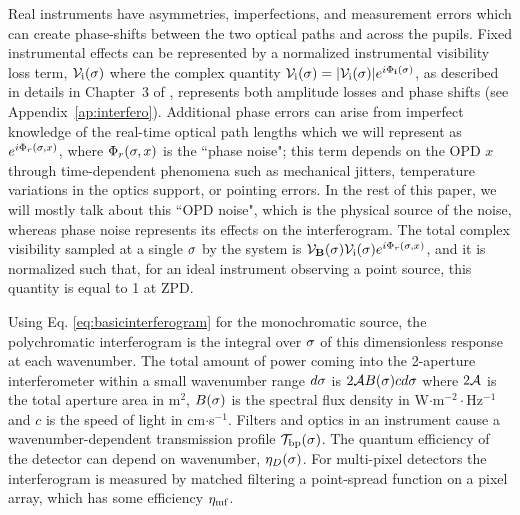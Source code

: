 
Real instruments have asymmetries, imperfections, and measurement errors which can create phase-shifts between the two optical paths and across the pupils.
Fixed instrumental effects 
can be represented by a normalized instrumental visibility loss term, 
$\mathcal{V}_\textrm{i}(\sigma)$ where the complex quantity $\mathcal{V}_\textrm{i}(\sigma) = |\mathcal{V}_\textrm{i}(\sigma)|e^{i\Phi_\mathbf{i}(\sigma)}$, as described in details in Chapter~3 of \cite{2000plbs.conf.....L}, represents both amplitude losses and phase shifts (see Appendix~\ref{ap:interfero}). Additional phase errors can arise from
imperfect knowledge of the real-time optical path lengths which we will represent as
$e^{i\Phi_r(\sigma, x)}$, where $\Phi_r(\sigma, x)$ is the ``phase noise"; this term depends on the OPD $x$ through time-dependent phenomena such as mechanical jitters, temperature variations in
the optics support, or pointing errors. In the rest of this paper, we will mostly talk about this ``OPD noise", which is the physical source of the noise, whereas phase noise represents its effects on the interferogram.
The total complex visibility sampled at a single $\sigma$ by the system is $\mathcal{V}_{\mathbf{B}}(\sigma)\mathcal{V}_\textrm{i}(\sigma) e^{i\Phi_r(\sigma, x)}$, and it is normalized such that, for an ideal instrument observing a point source, this quantity is equal to 1 at ZPD.

Using Eq. \ref{eq:basicinterferogram} for the monochromatic source, the polychromatic interferogram is the integral over $\sigma$ of this dimensionless response at each wavenumber. The total amount of power coming into the 2-aperture interferometer within a small wavenumber range $d\sigma$ is $2\mathcal{A} B(\sigma) c d\sigma$ where $2\mathcal{A}$ is the total aperture area in m$^2$, $B(\sigma)$ is the spectral flux density in W$\cdot$m$^{-2}\cdot$Hz$^{-1}$ and $c$ is the speed of light in cm$\cdot$s$^{-1}$. 
Filters and optics in an instrument cause a wavenumber-dependent transmission profile $\mathcal{T}_\textrm{bp}(\sigma)$. The quantum efficiency of the detector can depend on wavenumber, $\eta_D(\sigma)$. For multi-pixel detectors the interferogram is measured by matched filtering a point-spread function on a pixel array, which has some efficiency $\eta_\textrm{mf}$.%

